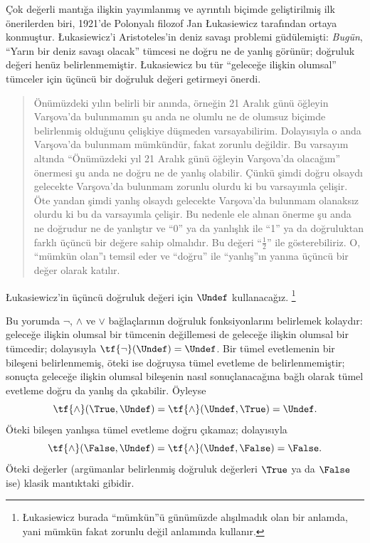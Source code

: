 



Çok değerli mantığa ilişkin yayımlanmış ve ayrıntılı biçimde geliştirilmiş
ilk önerilerden biri, 1921'de Polonyalı filozof Jan \L ukasiewicz tarafından
ortaya konmuştur. \L ukasiewicz'i Aristoteles'in deniz savaşı problemi
güdülemişti: \emph{Bugün}, “Yarın bir deniz savaşı olacak” tümcesi ne doğru
ne de yanlış görünür; doğruluk değeri henüz belirlenmemiştir. \L ukasiewicz
bu tür “geleceğe ilişkin olumsal” tümceler için üçüncü bir doğruluk değeri
getirmeyi önerdi.
\begin{quote}
Önümüzdeki yılın belirli bir anında, örneğin 21 Aralık günü öğleyin
Varşova'da bulunmamın şu anda ne olumlu ne de olumsuz biçimde belirlenmiş
olduğunu çelişkiye düşmeden varsayabilirim. Dolayısıyla o anda Varşova'da
bulunmam mümkündür, fakat zorunlu değildir. Bu varsayım altında “Önümüzdeki
yıl 21 Aralık günü öğleyin Varşova'da olacağım” önermesi şu anda ne doğru ne
de yanlış olabilir. Çünkü şimdi doğru olsaydı gelecekte Varşova'da bulunmam
zorunlu olurdu ki bu varsayımla çelişir. Öte yandan şimdi yanlış olsaydı
gelecekte Varşova'da bulunmam olanaksız olurdu ki bu da varsayımla çelişir.
Bu nedenle ele alınan önerme şu anda ne doğrudur ne de yanlıştır ve “0” ya da
yanlışlık ile “1” ya da doğruluktan farklı üçüncü bir değere sahip olmalıdır.
Bu değeri “$\frac{1}{2}$” ile gösterebiliriz. O, “mümkün olan”ı temsil eder
ve “doğru” ile “yanlış”ın yanına üçüncü bir değer olarak katılır.
\end{quote}
\L ukasiewicz'in üçüncü doğruluk değeri için $\Undef$ kullanacağız.
\footnote{\L ukasiewicz burada “mümkün”ü günümüzde alışılmadık olan bir
anlamda, yani mümkün fakat zorunlu değil anlamında kullanır.}

Bu yorumda $\lnot$, $\land$ ve $\lor$ bağlaçlarının doğruluk fonksiyonlarını
belirlemek kolaydır: geleceğe ilişkin olumsal bir tümcenin değillemesi de
geleceğe ilişkin olumsal bir tümcedir; dolayısıyla
$\tf{\lnot}(\Undef) = \Undef$. Bir tümel evetlemenin bir bileşeni
belirlenmemiş, öteki ise doğruysa tümel evetleme de belirlenmemiştir; sonuçta
geleceğe ilişkin olumsal bileşenin nasıl sonuçlanacağına bağlı olarak
tümel evetleme doğru da yanlış da çıkabilir. Öyleyse
\[
    \tf{\land}(\True, \Undef) =
\tf{\land}(\Undef, \True) =
\Undef.
\]
Öteki bileşen yanlışsa tümel evetleme doğru çıkamaz; dolayısıyla
\[\tf{\land}(\False, \Undef) =
\tf{\land}(\Undef, \False) = \False.\]
Öteki değerler (argümanlar belirlenmiş doğruluk değerleri $\True$ ya da
$\False$ ise) klasik mantıktaki gibidir.

